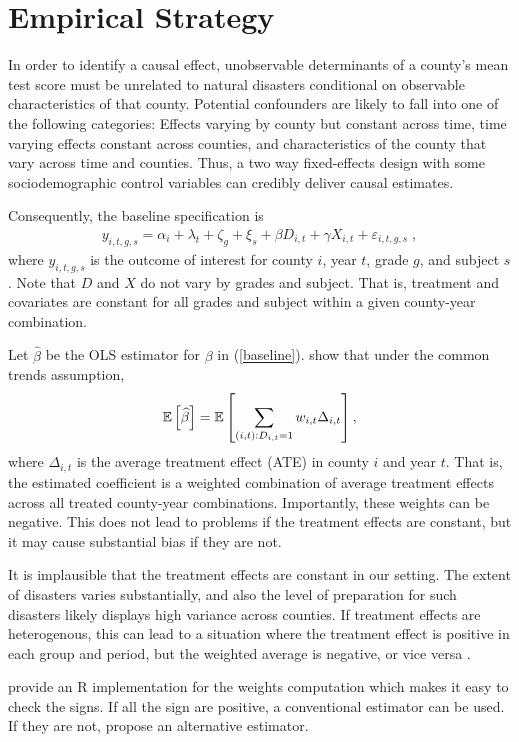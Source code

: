 
\section{Empirical Strategy}



In order to identify a causal effect, unobservable determinants of a county's mean test score must be unrelated to natural disasters conditional on observable characteristics of that county. Potential confounders are likely to fall into one of the following categories: Effects varying by county but constant across time, time varying effects constant across counties, and characteristics of the county that vary across time and counties. Thus, a two way fixed-effects design with some sociodemographic control variables can credibly deliver causal estimates.

Consequently, the baseline specification is
\begin{align} \label{baseline}
	y_{i, t, g, s} = \alpha_i + \lambda_t + \zeta_g + \xi_s + \beta D_{i, t} + \gamma X_{i, t} + \varepsilon_{i, t, g, s} \;,
\end{align}
where $y_{i, t, g, s}$ is the outcome of interest for county $i$, year $t$, grade $g$, and subject $s$. Note that $D$ and $X$ do not vary by grades and subject. That is, treatment and covariates are constant for all grades and subject within a given county-year combination.

Let $\widehat{\beta}$ be the OLS estimator for $\beta$ in (\ref{baseline}). \cite{deChaisemartin_2020} show that under the common trends assumption,
\begin{align*}
	\mathbb{E}\left[ \widehat{\beta} \right] = \mathbb{E}\left[  \sum_{(i, t): D_{i, t} = 1} w_{i, t} \Delta_{i, t} \right],
\end{align*}
where $\Delta_{i, t}$ is the average treatment effect (ATE) in county $i$ and year $t$. That is, the estimated coefficient is a weighted combination of average treatment effects across all treated county-year combinations. Importantly, these weights can be negative. This does not lead to problems if the treatment effects are constant, but it may cause substantial bias if they are not.

It is implausible that the treatment effects are constant in our setting. The extent of disasters varies substantially, and also the level of preparation for such disasters likely displays high variance across counties. If treatment effects are heterogenous, this can lead to a situation where the treatment effect is positive in each group and period, but the weighted average is negative, or vice versa \citep{deChaisemartin_2022}.

\cite{TwoWayFEWeights} provide an R implementation for the weights computation which makes it easy to check the signs. If all the sign are positive, a conventional estimator can be used. If they are not, \cite{deChaisemartin_2020} propose an alternative estimator.


